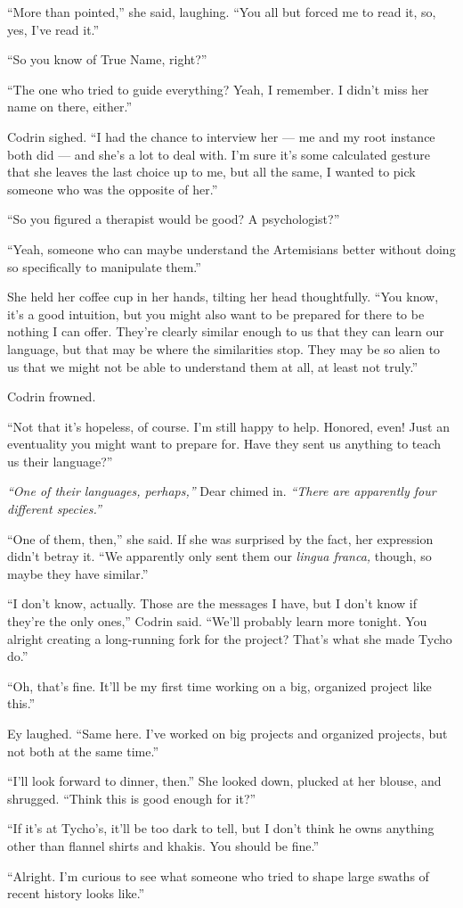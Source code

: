 ``More than pointed,'' she said, laughing. ``You all but forced me to read it, so, yes, I've read it.''

``So you know of True Name, right?''

``The one who tried to guide everything? Yeah, I remember. I didn't miss her name on there, either.''

Codrin sighed. ``I had the chance to interview her — me and my root instance both did — and she's a lot to deal with. I'm sure it's some calculated gesture that she leaves the last choice up to me, but all the same, I wanted to pick someone who was the opposite of her.''

``So you figured a therapist would be good? A psychologist?''

``Yeah, someone who can maybe understand the Artemisians better without doing so specifically to manipulate them.''

She held her coffee cup in her hands, tilting her head thoughtfully. ``You know, it's a good intuition, but you might also want to be prepared for there to be nothing I can offer. They're clearly similar enough to us that they can learn our language, but that may be where the similarities stop. They may be so alien to us that we might not be able to understand them at all, at least not truly.''

Codrin frowned.

``Not that it's hopeless, of course. I'm still happy to help. Honored, even! Just an eventuality you might want to prepare for. Have they sent us anything to teach us their language?''

\emph{``One of their languages, perhaps,''} Dear chimed in. \emph{``There are apparently four different species.''}

``One of them, then,'' she said. If she was surprised by the fact, her expression didn't betray it. ``We apparently only sent them our \emph{lingua franca,} though, so maybe they have similar.''

``I don't know, actually. Those are the messages I have, but I don't know if they're the only ones,'' Codrin said. ``We'll probably learn more tonight. You alright creating a long-running fork for the project? That's what she made Tycho do.''

``Oh, that's fine. It'll be my first time working on a big, organized project like this.''

Ey laughed. ``Same here. I've worked on big projects and organized projects, but not both at the same time.''

``I'll look forward to dinner, then.'' She looked down, plucked at her blouse, and shrugged. ``Think this is good enough for it?''

``If it's at Tycho's, it'll be too dark to tell, but I don't think he owns anything other than flannel shirts and khakis. You should be fine.''

``Alright. I'm curious to see what someone who tried to shape large swaths of recent history looks like.''
